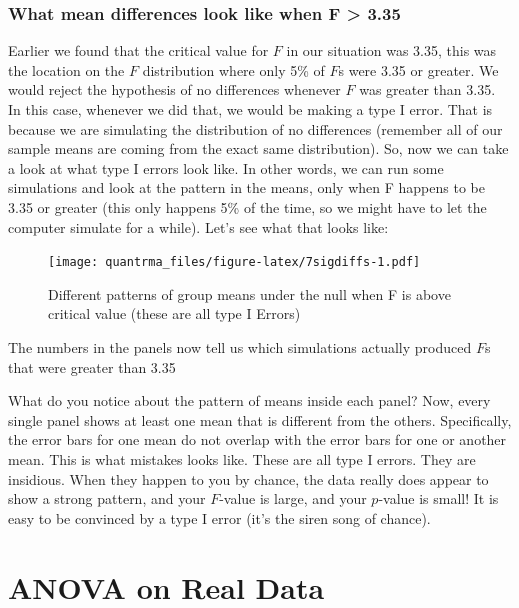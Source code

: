 \documentclass[
]{book}
\begin{document}
\hypertarget{what-mean-differences-look-like-when-f-3.35}{%
\subsubsection{What mean differences look like when F \textgreater{} 3.35}\label{what-mean-differences-look-like-when-f-3.35}}

Earlier we found that the critical value for \(F\) in our situation was 3.35, this was the location on the \(F\) distribution where only 5\% of \(F\)s were 3.35 or greater. We would reject the hypothesis of no differences whenever \(F\) was greater than 3.35. In this case, whenever we did that, we would be making a type I error. That is because we are simulating the distribution of no differences (remember all of our sample means are coming from the exact same distribution). So, now we can take a look at what type I errors look like. In other words, we can run some simulations and look at the pattern in the means, only when F happens to be 3.35 or greater (this only happens 5\% of the time, so we might have to let the computer simulate for a while). Let's see what that looks like:

\begin{figure}
\centering
\texttt{[image: quantrma\_files/figure-latex/7sigdiffs-1.pdf]}
\caption{\label{fig:7sigdiffs}Different patterns of group means under the null when F is above critical value (these are all type I Errors)}
\end{figure}

The numbers in the panels now tell us which simulations actually produced \(F\)s that were greater than 3.35

What do you notice about the pattern of means inside each panel? Now, every single panel shows at least one mean that is different from the others. Specifically, the error bars for one mean do not overlap with the error bars for one or another mean. This is what mistakes looks like. These are all type I errors. They are insidious. When they happen to you by chance, the data really does appear to show a strong pattern, and your \(F\)-value is large, and your \(p\)-value is small! It is easy to be convinced by a type I error (it's the siren song of chance).

\hypertarget{anova-on-real-data}{%
\section{ANOVA on Real Data}\label{anova-on-real-data}}
\end{document}
